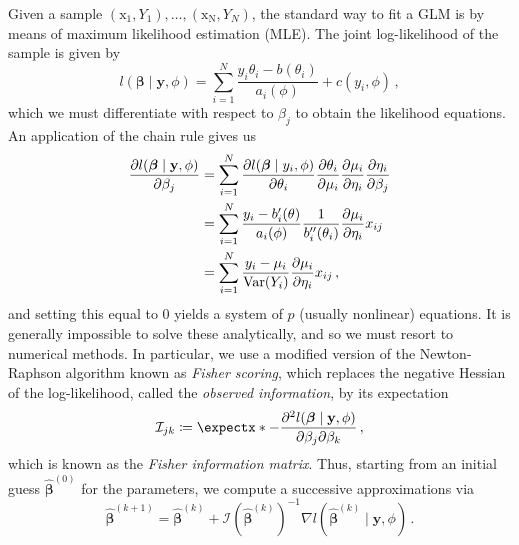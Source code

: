 \documentclass[a4paper]{book}
\begin{document}
Given a sample $(\bm{\mathrm{x_1}}, Y_1), \dots, (\bm{\mathrm{x_N}}, Y_N)$, the standard way to fit a GLM is by means of maximum likelihood estimation (MLE). The joint log-likelihood of the sample is given by
\begin{equation} \label{eq:joint-log-likelihood}
  l(\bm{\beta} \mid \mathbf{y}, \phi) = \sum_{i = 1}^N \frac{y_i \theta_i - b(\theta_i)}{a_i(\phi)} + c(y_i, \phi) \,,
\end{equation}
which we must differentiate with respect to $\beta_j$ to obtain the likelihood equations. An application of the chain rule gives us
\begin{align}
  \frac{\partial l(\bm{\beta} \mid \mathbf{y}, \phi)}{\partial \beta_j} & = \sum_{i = 1}^N \frac{\partial l(\bm{\beta} \mid y_i, \phi)}{\partial \theta_i} \frac{\partial \theta_i}{\partial \mu_i} \pdv{\mu_i}{\eta_i} \frac{\partial \eta_i}{\partial \beta_j} \\
                                                                        & = \sum_{i = 1}^N \frac{y_i - b'_i(\theta)}{a_i(\phi)} \frac{1}{b_i''(\theta_i)} \pdv{\mu_i}{\eta_i} x_{ij}                                                                             \\
                                                                        & = \sum_{i = 1}^N \frac{y_i - \mu_i}{\var{Y_i}} \pdv{\mu_i}{\eta_i} x_{ij} \,, \label{eq:grad-likelihood}
\end{align}
and setting this equal to $0$ yields a system of $p$ (usually nonlinear) equations. It is generally impossible to solve these analytically, and so we must resort to numerical methods. In particular, we use a modified version of the Newton-Raphson algorithm known as \emph{Fisher scoring}, which replaces the negative Hessian of the log-likelihood, called the \emph{observed information}, by its expectation
\begin{equation}
  \mathcal{I}_{jk} \coloneqq \expect{-\frac{\partial^2 l(\bm{\beta} \mid \mathbf{y}, \phi)}{\partial \beta_j \partial \beta_k}} \,,
\end{equation}
which is known as the \emph{Fisher information matrix}. Thus, starting from an initial guess $\bm{\widehat{\beta}}^{(0)}$ for the parameters, we compute a successive approximations via
\begin{equation} \label{eq:fisher-scoring}
  \bm{\widehat{\beta}}^{(k + 1)} = \bm{\widehat{\beta}}^{(k)} + \mathcal{I}(\bm{\widehat{\beta}}^{(k)})^{-1} \nabla l(\bm{\widehat{\beta}}^{(k)} \mid \mathbf{y}, \phi) \,.
\end{equation}
\end{document}
